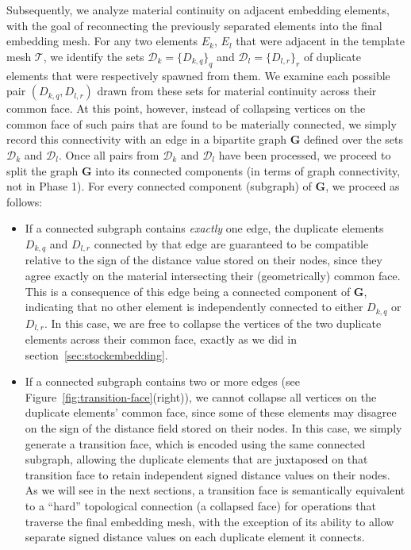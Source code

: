 Subsequently, we analyze material continuity on adjacent embedding
elements, with the goal of reconnecting the previously separated
elements into the final embedding mesh. For any two elements $E_k$,
$E_l$ that were adjacent in the template mesh $\mathcal{T}$, we
identify the sets $\mathcal{D}_k=\{D_{k,q}\}_q$ and
$\mathcal{D}_l=\{D_{l,r}\}_r$ of duplicate elements that were
respectively spawned from them. We examine each possible pair
$(D_{k,q}, D_{l,r})$ drawn from these sets for material continuity
across their common face. At this point, however, instead of
collapsing vertices on the common face of such pairs that are found to
be materially connected, we simply record this connectivity with an
edge in a bipartite graph $\mathbf{G}$ defined over the sets
$\mathcal{D}_k$ and $\mathcal{D}_l$. Once all pairs from
$\mathcal{D}_k$ and $\mathcal{D}_l$ have been processed, we proceed to
split the graph $\mathbf{G}$ into its connected components (in terms
of graph connectivity, not in Phase 1). For
every connected component (subgraph) of $\mathbf{G}$, we proceed as
follows:
\begin{itemize}
\vspace*{-.08in}
\item If a connected subgraph contains \emph{exactly} one edge, the
  duplicate elements $D_{k,q}$ and $D_{l,r}$ connected by that edge
  are guaranteed to be compatible relative to the sign of the distance
  value stored on their nodes, since they agree exactly on the
  material intersecting their (geometrically) common face. This is a
  consequence of this edge being a connected component of
  $\mathbf{G}$, indicating that no other element is independently
  connected to either $D_{k,q}$ or $D_{l,r}$. In this case, we are
  free to collapse the vertices of the two duplicate elements across
  their common face, exactly as we did in
  section~\ref{sec:stockembedding}.  \vspace*{-.08in}
\item If a connected subgraph contains two or more edges (see
  Figure~\ref{fig:transition-face}(right)), we cannot collapse all
  vertices on the duplicate elements' common face, since some of these
  elements may disagree on the sign of the distance field stored on
  their nodes. In this case, we simply generate a transition face,
  which is encoded using the same connected subgraph, allowing the
  duplicate elements that are juxtaposed on that transition face to
  retain independent signed distance values on their nodes.  As we
  will see in the next sections, a transition face is semantically
  equivalent to a ``hard'' topological connection (a collapsed face)
  for operations that traverse the final embedding mesh, with the
  exception of its ability to allow separate signed distance values on
  each duplicate element it connects.
\end{itemize}
\vspace*{-.08in}


